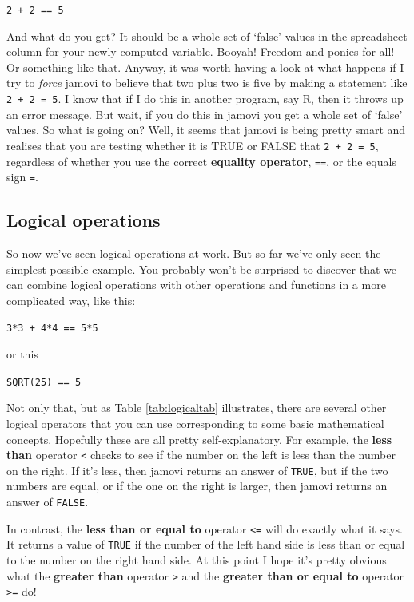\documentclass[
]{book}
\begin{document}
\texttt{2\ +\ 2\ ==\ 5}

And what do you get? It should be a whole set of `false' values in the spreadsheet column for your newly computed variable. Booyah! Freedom and ponies for all! Or something like that. Anyway, it was worth having a look at what happens if I try to \emph{force} jamovi to believe that two plus two is five by making a statement like \texttt{2\ +\ 2\ =\ 5}. I know that if I do this in another program, say R, then it throws up an error message. But wait, if you do this in jamovi you get a whole set of `false' values. So what is going on? Well, it seems that jamovi is being pretty smart and realises that you are testing whether it is TRUE or FALSE that \texttt{2\ +\ 2\ =\ 5}, regardless of whether you use the correct {\textbf{equality operator}}, \texttt{==}, or the equals sign \texttt{=}.

\hypertarget{logical-operations}{%
\subsection{Logical operations}\label{logical-operations}}

So now we've seen logical operations at work. But so far we've only seen the simplest possible example. You probably won't be surprised to discover that we can combine logical operations with other operations and functions in a more complicated way, like this:

\texttt{3*3\ +\ 4*4\ ==\ 5*5}

or this

\texttt{SQRT(25)\ ==\ 5}

Not only that, but as Table \ref{tab:logicaltab} illustrates, there are several other logical operators that you can use corresponding to some basic mathematical concepts. Hopefully these are all pretty self-explanatory. For example, the {\textbf{less than}} operator \texttt{\textless{}} checks to see if the number on the left is less than the number on the right. If it's less, then jamovi returns an answer of \texttt{TRUE}, but if the two numbers are equal, or if the one on the right is larger, then jamovi returns an answer of \texttt{FALSE}.

In contrast, the {\textbf{less than or equal to}} operator \texttt{\textless{}=} will do exactly what it says. It returns a value of \texttt{TRUE} if the number of the left hand side is less than or equal to the number on the right hand side. At this point I hope it's pretty obvious what the {\textbf{greater than}} operator \texttt{\textgreater{}} and the {\textbf{greater than or equal to}} operator \texttt{\textgreater{}=} do!
\end{document}
